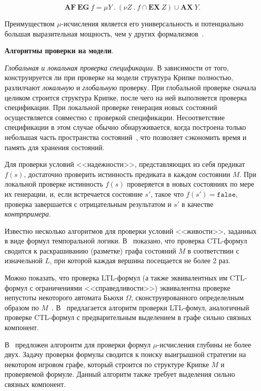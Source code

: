 \documentclass[a4paper,notitlepage,14pt]{article}
\begin{document}
$$\mathbf{AF~EG}~f = \mu Y~.~(\nu Z~.~f \cap \mathbf{EX}~Z) \cup \mathbf{AX}~Y.$$

Преимуществом $\mu$-исчисления является его универсальность и потенциально большая
выразительная мощность, чем у других формализмов~\cite{Emerson97modelchecking}.

\textbf{Алгоритмы проверки на модели}.

\textit{Глобальная и локальная проверка спецификации}. В зависимости от того,
конструируется ли при проверке на модели структура Крипке полностью, разлилчают
\emph{локальную} и \emph{глобальную} проверку. При глобальной проверке сначала целиком
строится структура Крипке, после чего на ней выполняется проверка спецификации. При
локальной проверке генерация новых состояний осуществляется совместно с проверкой
спецификации. Несоответствие спецификации в этом случае обычно обнаруживается, когда
построена только небольшая часть пространства состояний~\cite{Clarke}, что позволяет
сэкономить время и память для хранения состояний.

Для проверки условий <<надежности>>, представляющих из себя предикат $f(s)$, достаточно
проверить истинность предиката в каждом состоянии $M$. При локальной проверке истинность
$f(s)$ проверяется в новых состояниях по мере их генерации, и, если встречается состояние
$s'$, такое что $f(s') = \mathtt{false}$, проверка завершается с отрицательным результатом
и $s'$ в качестве \emph{контрпримера}.

Известно несколько алгоритмов для проверки условий <<живости>>, заданных в виде формул
темпоральной логики. В~\cite{Bhat95efficienton-the-fly} показано, что проверка CTL-формул
сводится к раскрашиванию (разметке) графа состояний $M$ в соответствии с изначельной $L$,
при которой каждая вершина посещается не более 2 раз.

Можно показать, что проверка LTL-формул (а также эквивалентных им CTL-формул с
ограничениями <<справедливости>>) эквивалентна проверке непустоты некоторого автомата
Бьюхи $\Omega$, сконструированного определелным образом по
$M$~\cite{Katoen}. В~\cite{Clarke97anotherlook} предлагается алгоритм проверки LTL-фомул,
аналогичный проверке CTL-формул с предварительным выделением в графе сильно связных
компонент.

В~\cite{Bollig_localparallel,Leucker_parallelmodel} предложен алгороитм для проверки
формул $\mu$-исчисления глубины не более двух. Задачу проверки формулы сводится к поиску
выигрышной стратегии на некотором игровом графе, который строится по структуре Крипке $M$
и проверяемой формуле. Данный алгоритм также требует выделения сильно связных компонент.
\end{document}
